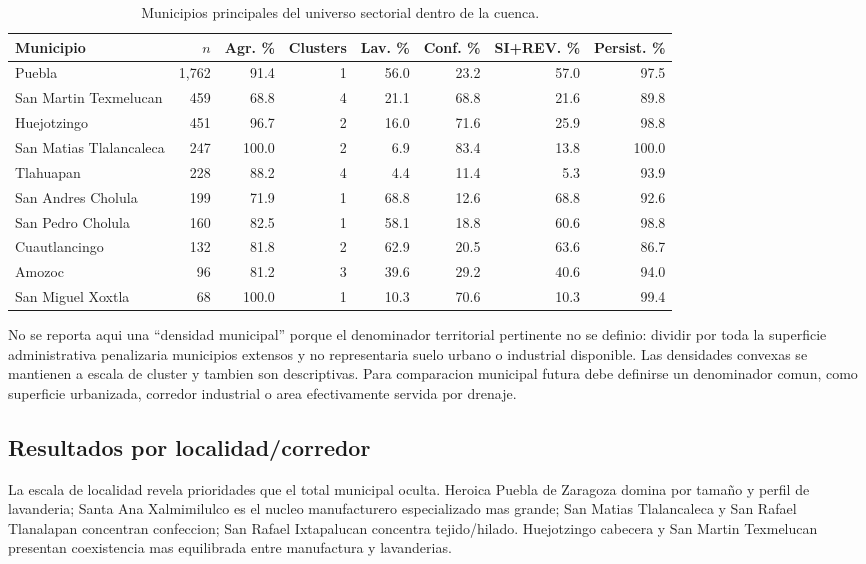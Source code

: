 \documentclass[11pt,letterpaper]{article}
\begin{document}
\begin{table}[H]
\centering
\scriptsize
\caption{Municipios principales del universo sectorial dentro de la cuenca.}
\begin{tabularx}{\textwidth}{Xrrrrrrr}
\toprule
\textbf{Municipio} & \textbf{$n$} & \textbf{Agr. \%} & \textbf{Clusters} & \textbf{Lav. \%} & \textbf{Conf. \%} & \textbf{SI+REV. \%} & \textbf{Persist. \%} \\
\midrule
Puebla & 1,762 & 91.4 & 1 & 56.0 & 23.2 & 57.0 & 97.5 \\
San Martin Texmelucan & 459 & 68.8 & 4 & 21.1 & 68.8 & 21.6 & 89.8 \\
Huejotzingo & 451 & 96.7 & 2 & 16.0 & 71.6 & 25.9 & 98.8 \\
San Matias Tlalancaleca & 247 & 100.0 & 2 & 6.9 & 83.4 & 13.8 & 100.0 \\
Tlahuapan & 228 & 88.2 & 4 & 4.4 & 11.4 & 5.3 & 93.9 \\
San Andres Cholula & 199 & 71.9 & 1 & 68.8 & 12.6 & 68.8 & 92.6 \\
San Pedro Cholula & 160 & 82.5 & 1 & 58.1 & 18.8 & 60.6 & 98.8 \\
Cuautlancingo & 132 & 81.8 & 2 & 62.9 & 20.5 & 63.6 & 86.7 \\
Amozoc & 96 & 81.2 & 3 & 39.6 & 29.2 & 40.6 & 94.0 \\
San Miguel Xoxtla & 68 & 100.0 & 1 & 10.3 & 70.6 & 10.3 & 99.4 \\
\bottomrule
\end{tabularx}
\end{table}

No se reporta aqui una ``densidad municipal'' porque el denominador territorial pertinente no se definio: dividir por toda la superficie administrativa penalizaria municipios extensos y no representaria suelo urbano o industrial disponible. Las densidades convexas se mantienen a escala de cluster y tambien son descriptivas. Para comparacion municipal futura debe definirse un denominador comun, como superficie urbanizada, corredor industrial o area efectivamente servida por drenaje.

\subsection{Resultados por localidad/corredor}

La escala de localidad revela prioridades que el total municipal oculta. Heroica Puebla de Zaragoza domina por tamaño y perfil de lavanderia; Santa Ana Xalmimilulco es el nucleo manufacturero especializado mas grande; San Matias Tlalancaleca y San Rafael Tlanalapan concentran confeccion; San Rafael Ixtapalucan concentra tejido/hilado. Huejotzingo cabecera y San Martin Texmelucan presentan coexistencia mas equilibrada entre manufactura y lavanderias.
\end{document}
